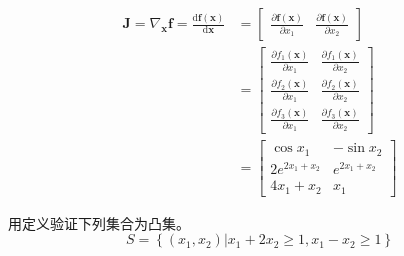 \begin{solution}
    $$\begin{aligned}
        \boldsymbol{J}=\nabla_{\boldsymbol{x}} \boldsymbol{f}=\frac{\mathrm{d} \boldsymbol{f}(\boldsymbol{x})}{\mathrm{d} \boldsymbol{x}}&=\begin{bmatrix}
            \frac{\partial \boldsymbol{f}(\boldsymbol{x})}{\partial x_{1}}  & \frac{\partial \boldsymbol{f}(\boldsymbol{x})}{\partial x_{2}}
        \end{bmatrix}\\
        &=\begin{bmatrix}
            \frac{\partial f_{1}(\boldsymbol{x})}{\partial x_{1}} & \frac{\partial f_{1}(\boldsymbol{x})}{\partial x_{2}} \\
            \frac{\partial f_{2}(\boldsymbol{x})}{\partial x_{1}} & \frac{\partial f_{2}(\boldsymbol{x})}{\partial x_{2}} \\
            \frac{\partial f_{3}(\boldsymbol{x})}{\partial x_{1}} & \frac{\partial f_{3}(\boldsymbol{x})}{\partial x_{2}}
        \end{bmatrix}\\
        &=\begin{bmatrix}
            \cos x_1 & -\sin x_2\\
            2e^{2x_1+x_2} & e^{2x_1+x_2}\\
            4x_1+x_2 & x_1
        \end{bmatrix}
    \end{aligned}$$
\end{solution}

\begin{problem}
    用定义验证下列集合为凸集。
    $$S=\left\{(x_1, x_2) | x_1 + 2x_2 \ge 1, x_1 - x_2 \ge 1\right\}$$
\end{problem}

